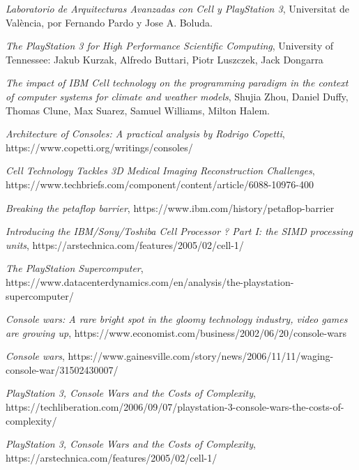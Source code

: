 \documentclass[10pt,compsoc]{IEEEtran}
\begin{document}
	
		\begin{thebibliography}{1}
			
			{\it{Laboratorio de Arquitecturas Avanzadas con Cell y PlayStation 3}}, Universitat de València, por Fernando Pardo y Jose A. Boluda.\newline
			
			{\it{The PlayStation 3 for High Performance Scientific Computing}}, University of Tennessee: Jakub Kurzak, Alfredo Buttari, Piotr Luszczek, Jack Dongarra\newline
			
			{\it{The impact of IBM Cell technology on the programming paradigm in the context of computer systems	for climate and weather	models}}, Shujia Zhou, Daniel Duffy, Thomas Clune, Max Suarez, 	Samuel Williams, Milton Halem.\newline
			
			{\it{Architecture of Consoles: A practical analysis by Rodrigo Copetti}}, 
			https://www.copetti.org/writings/consoles/\newline
			
			{\it{Cell Technology Tackles 3D Medical Imaging Reconstruction Challenges}}, https://www.techbriefs.com/component/content/article/6088-10976-400\newline
			
			{\it{Breaking the petaflop barrier}},
			https://www.ibm.com/history/petaflop-barrier\newline
			
			{\it{Introducing the IBM/Sony/Toshiba Cell Processor ? Part I: the SIMD processing units}},
			https://arstechnica.com/features/2005/02/cell-1/\newline
			
			{\it{The PlayStation Supercomputer}}, https://www.datacenterdynamics.com/en/analysis/the-playstation-supercomputer/\newline
	
			{\it{Console wars: A rare bright spot in the gloomy technology industry, video games are growing up}}, 
			https://www.economist.com/business/2002/06/20/console-wars\newline
			

			{\it{Console wars}}, 			
			https://www.gainesville.com/story/news/2006/11/11/waging-console-war/31502430007/\newline
			
			{\it{PlayStation 3, Console Wars and the Costs of Complexity}}, 			
			https://techliberation.com/2006/09/07/playstation-3-console-wars-the-costs-of-complexity/\newline
			
			
			{\it{PlayStation 3, Console Wars and the Costs of Complexity}}, 			
			https://arstechnica.com/features/2005/02/cell-1/
			

			
		
		\end{thebibliography}
		
			
	
		
\end{document}
